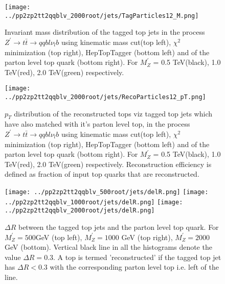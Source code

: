 \documentclass[12pt,a4paper]{article}		%
\begin{document}
\newpage 

\begin{figure}[h]
	\begin{centering}	
		\texttt{[image: ../pp2zp2tt2qqblv\_2000root/jets/TagParticles12\_M.png]} 
		\caption{ Invariant mass distribution of the tagged top jets in the process  $Z^\prime \to t \bar{t} \to qqbl\nu_{l}b$ using kinematic mass cut(top left), $\chi^2$ minimization (top right), HepTopTagger (bottom left) and of the parton level top quark (bottom right). For $M_Z^\prime$ = 0.5 TeV(black), 1.0 TeV(red), 2.0 TeV(green)  respectively. }
		\label{topm}
		\centering
	\end{centering} 		
\end{figure}

\begin{figure}[h]
	\begin{centering}	
		\texttt{[image: ../pp2zp2tt2qqblv\_2000root/jets/RecoParticles12\_pT.png]} 
		\caption{ $p_T$ distribution of the reconstructed tops viz tagged top jets which have also matched with it's parton level top, in the process  $Z^\prime \to t \bar{t} \to qqbl\nu_{l}b$ using kinematic mass cut(top left), $\chi^2$ minimization (top right), HepTopTagger (bottom left) and of the parton level top quark (bottom right). For $M_Z^\prime$ = 0.5 TeV(black), 1.0 TeV(red), 2.0 TeV(green)  respectively. Reconstruction efficiency is defined as fraction of input top quarks that are reconstructed. }
		\label{toppt}
		\centering
	\end{centering} 		
\end{figure}   
\newpage

\begin{figure}[h]
	\begin{centering}	
		\texttt{[image: ../pp2zp2tt2qqblv\_500root/jets/delR.png]} 
		\texttt{[image: ../pp2zp2tt2qqblv\_1000root/jets/delR.png]} 
		\texttt{[image: ../pp2zp2tt2qqblv\_2000root/jets/delR.png]}
		\caption{ $\Delta R$ between the tagged top jets and the parton level top quark. For $M_Z^\prime = 500$GeV (top left), $M_Z^\prime = 1000$ GeV (top right), $M_Z^\prime = 2000$ GeV (bottom). Vertical black line in all the histograms denote the value $\Delta R = 0.3$. A top is termed 'reconstructed' if the tagged top jet has $\Delta R < 0.3$  with the corresponding parton level top i.e. left of the line.}
		\label{delR}
		\centering
	\end{centering} 		
\end{figure}   
\end{document}
